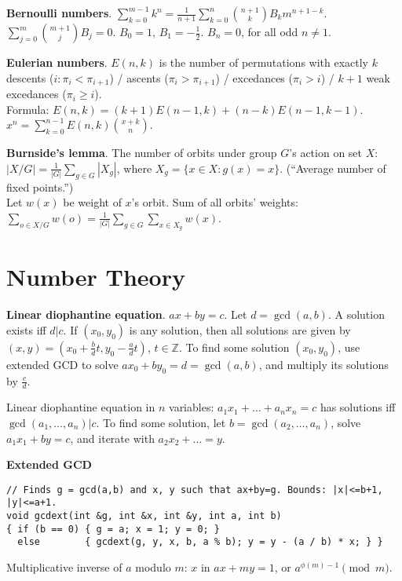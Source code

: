 \documentclass[a4paper, 12pt]{article}
\let\ge=\geqslant
\newcommand{\Section}[1]{
  \section*{#1}
  \addcontentsline{toc}{subsection}{#1}
  \vspace{-3mm}
}
\newcommand{\Topic}[1]{\textbf{#1}}
\begin{document}
\Topic{Bernoulli numbers}.
$\sum_{k=0}^{m-1} k^n =
\frac{1}{n+1} \sum_{k=0}^n {n+1 \choose k} B_k m^{n+1-k}$. \\
$\sum_{j=0}^m {m+1 \choose j} B_j = 0$.
\quad $B_0=1$, $B_1=-\frac{1}{2}$. $B_n=0$, for all odd $n \ne 1$.


\Topic{Eulerian numbers}.
$E(n,k)$ is the number of permutations with exactly
$k$ descents ($i: \pi_i < \pi_{i+1}$) /
ascents ($\pi_i > \pi_{i+1}$) /
excedances ($\pi_i > i$) /
$k+1$ weak excedances ($\pi_i \ge i$). \\
Formula: $E(n,k)=(k+1)E(n-1,k)+(n-k)E(n-1,k-1)$. \quad
$x^n = \sum_{k=0}^{n-1} E(n,k) {x+k \choose n}$.

\Topic{Burnside's lemma}.
The number of orbits under group $G$'s action on set $X$:\\
$|X/G| = \frac{1}{|G|} \sum_{g \in G} |X_g|$,
where $X_g=\{ x \in X: g(x)=x \}$. (``Average number of fixed points.'') \\
Let $w(x)$ be weight of $x$'s orbit. Sum of all orbits' weights:
$\sum_{o \in X/G} w(o) = \frac{1}{|G|} \sum_{g \in G} \sum_{x \in X_g} w(x)$.




\Section{Number Theory}

\Topic{Linear diophantine equation}. $ax+by=c$.
Let $d=\gcd(a,b)$. A solution exists iff $d|c$.
If $(x_0,y_0)$ is any solution, then all solutions are given by
$(x,y) = (x_0 + \frac{b}{d}t, y_0 - \frac{a}{d}t)$, $t \in {\mathbb Z}$.
To find some solution $(x_0, y_0)$, use extended GCD to solve
$ax_0 + by_0 = d = \gcd(a, b)$, and multiply its solutions by $\frac{c}{d}$.

Linear diophantine equation in $n$ variables:
$a_1 x_1 + \dots + a_n x_n = c$ has solutions iff $\gcd(a_1, \dots, a_n) | c$.
To find some solution, let $b=\gcd(a_2, \dots, a_n)$,
solve $a_1 x_1 + by = c$, and iterate with $a_2 x_2 + \dots = y$.

\Topic{Extended GCD}
\vspace{-5mm}
\begin{verbatim}
// Finds g = gcd(a,b) and x, y such that ax+by=g. Bounds: |x|<=b+1, |y|<=a+1.
void gcdext(int &g, int &x, int &y, int a, int b)
{ if (b == 0) { g = a; x = 1; y = 0; }
  else        { gcdext(g, y, x, b, a % b); y = y - (a / b) * x; } }
\end{verbatim}
\vspace{-3mm}

Multiplicative inverse of $a$ modulo $m$:
$x$ in $ax + my = 1$, or $a^{\phi(m)-1} \pmod{m}$.
\end{document}

